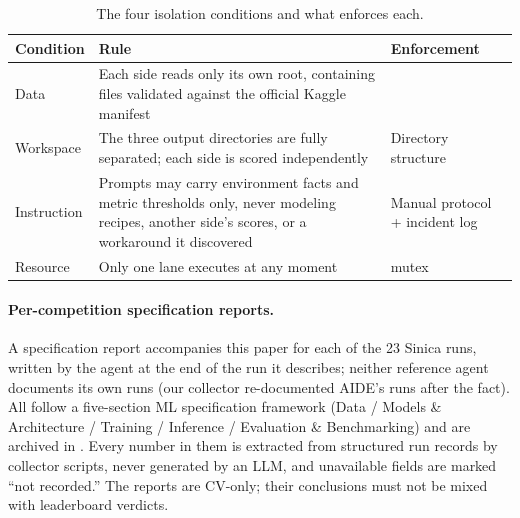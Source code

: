 \documentclass[11pt,a4paper]{article}
\begin{document}
\begin{table}[htbp]
\centering\small
\caption{The four isolation conditions and what enforces each.}
\label{tab:fairness}
\begin{tabular}{@{}L{2.6cm}L{6.4cm}L{5.6cm}@{}}
\toprule
\textbf{Condition} & \textbf{Rule} & \textbf{Enforcement} \\
\midrule
Data & Each side reads only its own root, containing files validated against the official Kaggle manifest &  \\
Workspace & The three output directories are fully separated; each side is scored independently & Directory structure \\
Instruction & Prompts may carry environment facts and metric thresholds only, never modeling recipes, another side's scores, or a workaround it discovered & Manual protocol + incident log \\
Resource & Only one lane executes at any moment &  mutex \\
\bottomrule
\end{tabular}
\end{table}


\paragraph{Per-competition specification reports.} A specification report accompanies this paper for each of the 23 Sinica runs, written by the agent at the end of the run it describes; neither reference agent documents its own runs (our collector re-documented AIDE's runs after the fact). All follow a five-section ML specification framework (Data / Models \& Architecture / Training / Inference / Evaluation \& Benchmarking) and are archived in . Every number in them is extracted from structured run records by collector scripts, never generated by an LLM, and unavailable fields are marked ``not recorded.'' The reports are CV-only; their conclusions must not be mixed with leaderboard verdicts.
\end{document}
